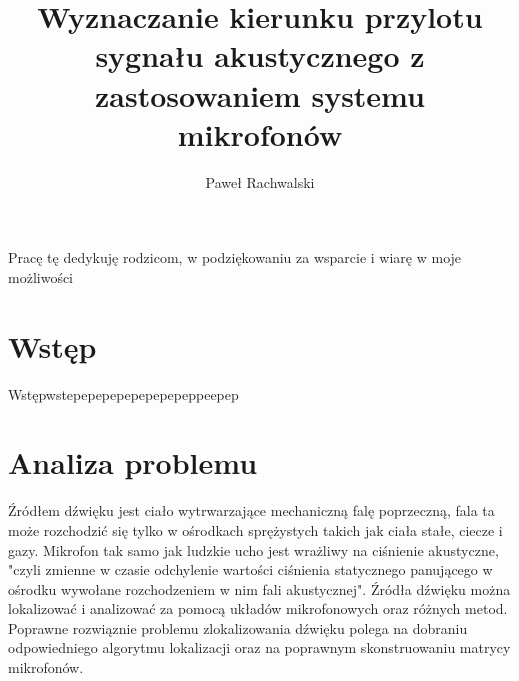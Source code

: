 \documentclass[eng,printmode]{mgr}
\title{Wyznaczanie kierunku przylotu sygnału akustycznego z zastosowaniem systemu mikrofonów}
\author{Paweł Rachwalski}
\begin{document}

\maketitle %
\dedication{6cm}{Pracę tę dedykuję rodzicom, w podziękowaniu za wsparcie i wiarę w moje możliwości}

\tableofcontents %

\chapter{Wstęp}
Wstępwstepepepepepepepepeppeepep

\chapter{Analiza problemu}
Źródłem dźwięku jest ciało wytrwarzające mechaniczną falę poprzeczną, fala ta może rozchodzić się tylko w ośrodkach sprężystych takich jak ciała stałe, ciecze i gazy. Mikrofon tak samo jak ludzkie ucho jest wrażliwy na ciśnienie akustyczne, "czyli zmienne w czasie odchylenie wartości ciśnienia statycznego panującego w ośrodku wywołane rozchodzeniem w nim fali akustycznej". %
Źródła dźwięku można lokalizować i analizować za pomocą układów mikrofonowych oraz różnych metod. Poprawne rozwiąznie problemu zlokalizowania dźwięku polega na dobraniu odpowiedniego algorytmu lokalizacji oraz na poprawnym skonstruowaniu matrycy mikrofonów.  \newline
\end{document}
